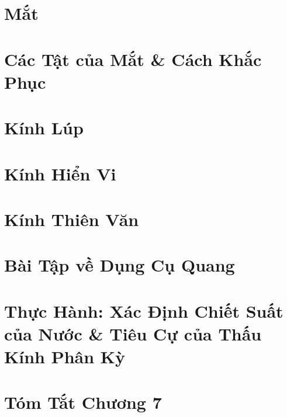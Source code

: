 \documentclass[oneside]{book}
\numberwithin{equation}{section}
\begin{document}

\section{Mắt}


\section{Các Tật của Mắt \& Cách Khắc Phục}


\section{Kính Lúp}


\section{Kính Hiển Vi}


\section{Kính Thiên Văn}


\section{Bài Tập về Dụng Cụ Quang}


\section{Thực Hành: Xác Định Chiết Suất của Nước \& Tiêu Cự của Thấu Kính Phân Kỳ}


\section{Tóm Tắt Chương 7}


\printbibliography[heading=bibintoc]
	
\end{document}
